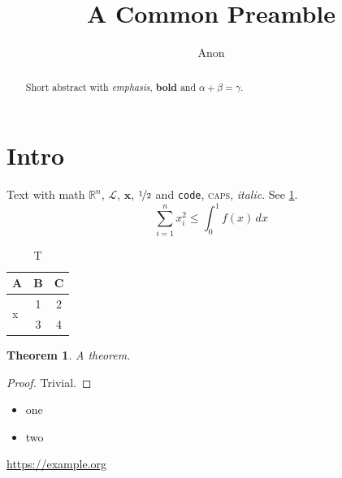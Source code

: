 \documentclass[11pt]{article}
\title{A Common Preamble}
\author{Anon}
\newtheorem{theorem}{Theorem}
\begin{document}
\maketitle
\begin{abstract}Short abstract with \emph{emphasis}, \textbf{bold} and $\alpha+\beta=\gamma$.\end{abstract}
\section{Intro}\label{sec:intro}
Text \cite{a} with math $\mathbb{R}^n$, $\mathcal{L}$, $\bm{x}$, $\nicefrac{1}{2}$ and \texttt{code}, \textsc{caps}, \textit{italic}. See \cref{sec:intro}.
\begin{equation}\label{eq:1} \sum_{i=1}^n x_i^2 \leq \int_0^1 f(x)\,dx \end{equation}
\begin{table}[h]\centering\begin{tabular}{lcc}\toprule A & B & C\\\midrule \multirow{2}{*}{x} & 1 & 2\\ & 3 & 4\\\bottomrule\end{tabular}\caption{T}\end{table}
\begin{theorem}A theorem.\end{theorem}\begin{proof}Trivial.\end{proof}
\begin{itemize}\item one\item two\end{itemize}
\url{https://example.org}


\end{document}
